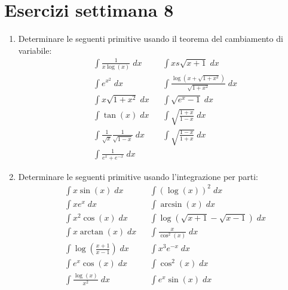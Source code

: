\section{Esercizi settimana 8}
\begin{enumerate}
	\item Determinare le seguenti primitive usando il teorema  del cambiamento di variabile:
	      \begin{align*}
		       & \int \frac{1}{x \log \left(x\right)} \; dx        &  & \int x s\sqrt{x+ 1}\; dx                                                  \\
		       & \int e^{x^2 } \; dx                               &  & \int \frac{\log \left(x + \sqrt{ 1 + x^2 }\right)}{\sqrt{ 1 + x^2 }}\; dx \\
		       & \int x\sqrt{1 + x^2}   \; dx                      &  & \int \sqrt{e^{x} - 1} \; dx                                               \\
		       & \int \tan \left(x\right) \; dx                    &  & \int \sqrt{\frac{1 + x}{1 -x}} \; dx                                      \\
		       & \int \frac{1}{\sqrt{x}}\frac{1}{\sqrt{1-x}} \; dx &  & \int \sqrt{\frac{1-x}{1+x}}\; dx                                          \\
		       & \int \frac{1}{e^{x} + e^{ -x}} \; dx              &  &
	      \end{align*}
	\item Determinare le seguenti primitive usando l'integrazione per parti:
	      \begin{align*}
		       & \int x \sin \left(x\right)\; dx             &  & \int \left(\log \left(x\right)\right)^2 \; dx       \\
		       & \int x e^{x} \; dx                          &  & \int \arcsin \left(x\right) \; dx                   \\
		       & \int x^2  \cos \left(x\right)\; dx          &  & \int \log \left(\sqrt{x+1} - \sqrt{x-1}\right)\; dx \\
		       & \int x \arctan\left(x\right)\; dx           &  & \int \frac{x}{\cos  ^2 \left(x\right)} \; dx        \\
		       & \int \log \left(\frac{x+1}{x-1}\right)\; dx &  & \int x^3  e ^{-x}\; dx                              \\
		       & \int e ^{x} \cos \left(x\right)\; dx        &  & \int \cos ^2 \left(x\right)\; dx                    \\
		       & \int \frac{\log \left(x\right)}{x^2 }\; dx  &  & \int e^{x} \sin \left(x\right)\; dx                 \\

\end{align*}
\end{enumerate}
